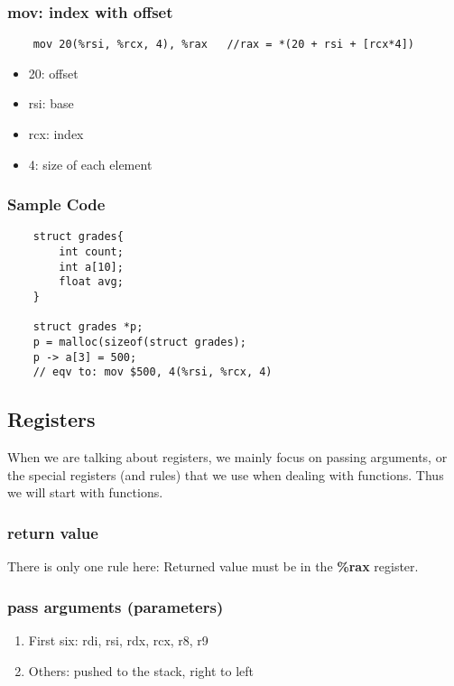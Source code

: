 \documentclass{article}
\begin{document}
\subsubsection*{mov: index with offset}
\begin{verbatim}
    mov 20(%rsi, %rcx, 4), %rax   //rax = *(20 + rsi + [rcx*4])
\end{verbatim}
\begin{itemize}
    \item 20: offset
    \item rsi: base
    \item rcx: index
    \item 4: size of each element
\end{itemize}

\subsubsection*{Sample Code}
\begin{verbatim}
    struct grades{
        int count;
        int a[10];
        float avg;
    }

    struct grades *p;
    p = malloc(sizeof(struct grades);
    p -> a[3] = 500;
    // eqv to: mov $500, 4(%rsi, %rcx, 4)
\end{verbatim}

\subsection{Registers}
When we are talking about registers, we mainly focus on passing arguments, or the special registers (and rules) that we use when dealing with functions. Thus we will start with functions.
\subsubsection{return value}
There is only one rule here: Returned value must be in the \textbf{\%rax} register.

\subsubsection{pass arguments (parameters)}
\begin{enumerate}
    \item First six: rdi, rsi, rdx, rcx, r8, r9
    \item Others: pushed to the stack, right to left
\end{enumerate}
\end{document}
